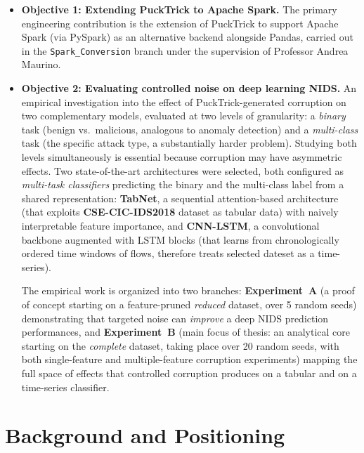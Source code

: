 \documentclass[a4paper, 9pt]{extarticle}
\begin{document}
\begin{itemize}
  \item \textbf{Objective 1: Extending PuckTrick to Apache Spark.} The primary engineering contribution is the extension of PuckTrick to support Apache Spark (via PySpark) as an alternative backend alongside Pandas, carried out in the \texttt{Spark\_Conversion} branch under the supervision of Professor Andrea Maurino.
  \item \textbf{Objective 2: Evaluating controlled noise on deep learning NIDS.} An empirical investigation into the effect of PuckTrick-generated corruption on two complementary models, evaluated at two levels of granularity: a \emph{binary} task (benign vs.\ malicious, analogous to anomaly detection) and a \emph{multi-class} task (the specific attack type, a substantially harder problem). Studying both levels simultaneously is essential because corruption may have asymmetric effects. Two state-of-the-art architectures were selected, both configured as \emph{multi-task classifiers} predicting the binary and the multi-class label from a shared representation: \textbf{TabNet}, a sequential attention-based architecture (that exploits \textbf{CSE-CIC-IDS2018} dataset as tabular data) with naively interpretable feature importance, and \textbf{CNN-LSTM}, a convolutional backbone augmented with LSTM blocks (that learns from chronologically ordered time windows of flows, therefore treats selected dateset as a time-series).
  
  The empirical work is organized into two branches: \textbf{Experiment~A} (a proof of concept starting on a feature-pruned \emph{reduced} dataset, over 5 random seeds) demonstrating that targeted noise can \emph{improve} a deep NIDS prediction performances, and \textbf{Experiment~B} (main focus of thesis: an analytical core starting on the \emph{complete} dataset, taking place over 20 random seeds, with both single-feature and multiple-feature corruption experiments) mapping the full space of effects that controlled corruption produces on a tabular and on a time-series classifier.
\end{itemize}



\section{Background and Positioning}
\end{document}
